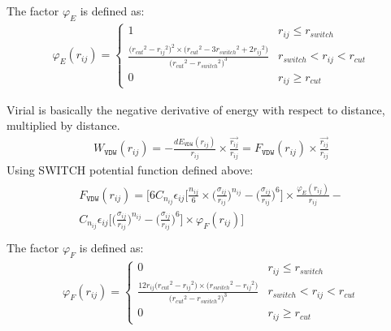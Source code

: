 \documentclass[letterpaper,10pt,english]{sphinxmanual}
\begin{document}
\begin{description}
\sphinxAtStartPar
The factor \(\varphi_E\) is defined as:
\begin{equation*}
\begin{split}\varphi_E(r_{ij}) =
\begin{cases}
  1 & r_{ij} \leq r_{switch} \\
  \frac{\big({r_{cut}}^2 - {r_{ij}}^2 \big)^2 \times \big({r_{cut}}^2 - 3{r_{switch}}^2 + 2{r_{ij}}^2 \big)}{\big({r_{cut}}^2 - {r_{switch}}^2 \big)^3} & r_{switch} < r_{ij} < r_{cut} \\
  0 & r_{ij} \geq r_{cut}
\end{cases}\end{split}
\end{equation*}
\item[{\sphinxcode{\sphinxupquote{Virial Calculation}}}] \leavevmode
\sphinxAtStartPar
Virial is basically the negative derivative of energy with respect to distance, multiplied by distance.
\begin{equation*}
\begin{split}W_{\texttt{VDW}}(r_{ij}) = -\frac{dE_{\texttt{VDW}}(r_{ij})}{r_{ij}}\times \frac{\overrightarrow{r_{ij}}}{{r_{ij}}} = F_{\texttt{VDW}}(r_{ij}) \times \frac{\overrightarrow{r_{ij}}}{{r_{ij}}}\end{split}
\end{equation*}
\sphinxAtStartPar
Using SWITCH potential function defined above:
\begin{align*}\!\begin{aligned}
F_{\texttt{VDW}}(r_{ij}) = \Bigg[6 C_{n_{ij}} \epsilon_{ij} \bigg[\frac{n_{ij}}{6} \times \bigg(\frac{\sigma_{ij}}{r_{ij}}\bigg)^{n_{ij}} - \bigg(\frac{\sigma_{ij}}{r_{ij}}\bigg)^6\bigg]\times \frac{\varphi_E(r_{ij})}{{r_{ij}}}  -\\
C_{n_{ij}} \epsilon_{ij} \bigg[\bigg(\frac{\sigma_{ij}}{r_{ij}}\bigg)^{n_{ij}} - \bigg(\frac{\sigma_{ij}}{r_{ij}}\bigg)^6\bigg] \times \varphi_F(r_{ij}) \Bigg]\\
\end{aligned}\end{align*}
\sphinxAtStartPar
The factor \(\varphi_F\) is defined as:
\begin{equation*}
\begin{split}\varphi_F(r_{ij}) =
\begin{cases}
  0 & r_{ij} \leq r_{switch} \\
  \frac{12r_{ij}\big({r_{cut}}^2 - {r_{ij}}^2 \big) \times \big({r_{switch}}^2 - {r_{ij}}^2 \big)}{\big({r_{cut}}^2 - {r_{switch}}^2 \big)^3} & r_{switch} < r_{ij} < r_{cut} \\
  0 & r_{ij} \geq r_{cut}
\end{cases}\end{split}
\end{equation*}
\begin{figure}[htbp]
\centering
\capstart


\end{figure}
\end{description}
\end{document}
